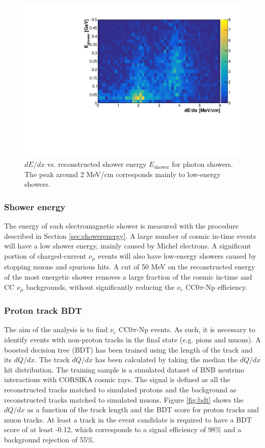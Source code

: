 \begin{figure}[htbp]
\centering
  \includegraphics[width=0.7\linewidth]{figures/dedx_energy.pdf}
  \caption{$dE/dx$ vs. reconstructed shower energy $E_{\mathrm{shower}}$ for photon showers. The peak around 2 MeV/cm corresponds mainly to low-energy showers.}\label{fig:dedx_energy}
\end{figure}


\subsubsection{Shower energy}
The energy of each electromagnetic shower is measured with the procedure described in Section \ref{sec:showerenergy}. A large number of cosmic in-time events will have a low shower energy, mainly caused by Michel electrons. A significant portion of charged-current $\nu_{\mu}$ events will also have low-energy showers caused by stopping muons and spurious hits. A cut of 50 MeV on the reconstructed energy of the most energetic shower removes a large fraction of the cosmic in-time and CC $\nu_{\mu}$ backgrounds, without significantly reducing the $\nu_{e}$ CC0$\pi$-Np efficiency. 


\subsubsection{Proton track BDT}\label{sec:protbdt}
The aim of the analysis is to find $\nu_{e}$ CC$0\pi$-Np events. As such, it is necessary to identify events with non-proton tracks in the final state (e.g. pions and muons). A boosted decision tree (BDT) has been trained using the length of the track and its $dQ/dx$. The track $dQ/dx$ has been calculated by taking the median the $dQ/dx$ hit distribution. The training sample is a simulated dataset of BNB neutrino interactions with CORSIKA cosmic rays. The signal is defined as all the reconstructed tracks matched to simulated protons and the background as reconstructed tracks matched to simulated muons. Figure \ref{fig:bdt} shows the $dQ/dx$ as a function of the track length and the BDT score for proton tracks and muon tracks. At least a track in the event candidate is required to have a BDT score of at least -0.12, which corresponds to a signal efficiency of 98\% and a background rejection of 55\%. 

